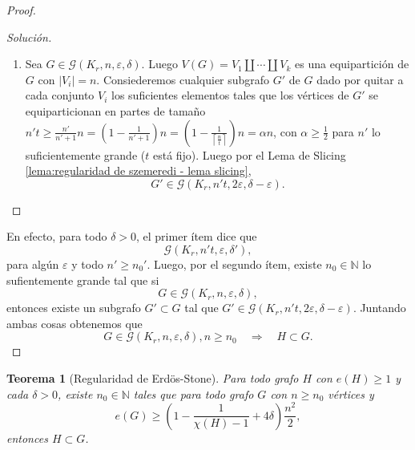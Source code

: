 \documentclass[12pt]{report}
\theoremstyle{plain}
\newtheorem{theorem}{Teorema}[section]
\theoremstyle{definition}
\newenvironment{solution}{\begin{proof}[Solución]}{\end{proof}}
\newcommand{\naturals}{\mathbb{N}}
\newcommand{\abs}[1]{\left \vert #1 \right \vert}
\newcommand{\ceil}[1]{\left\lceil #1  \right\rceil}
\begin{document}
\begin{proof}
\begin{solution}
\begin{enumerate}[(1)]
Ahora busquemos $\varepsilon$ y $\delta'$ tales que $G \in \mathcal G (K_r (t), n', \varepsilon ', \delta')$. Pero si $w_i^j w_{i'}^{j'} \in E(K_r (t))$, entonces $w_i w_{i'} \in E(K_r)$, y por lo tanto el par $(V_i, V_{i'})$ es $\varepsilon$ regular y como $\abs {V_i^j} = \frac{1}{t} \abs{V_i}$ para todo $1 \leq j \leq t$, el Lema de Slicing \ref{lema:regularidad de szemeredi - lema slicing} garantiza que los pares $(V_i^j, V_{i'}^{j'})$ para $1 \leq j,j' \leq t$ son $\max \{t \varepsilon, 2 \varepsilon\}$-regularaes si $\varepsilon$ es lo suficientemente pequeño, i.e. $\frac 1 t > \varepsilon$. En cuanto a la densidad, nuevamente el Lema de Slicing garantiza que
\[
    d(A_i^j, A_{i'}^{j'}) \geq d(A_i, A_{i'}) - \varepsilon  \geq \delta - \varepsilon.
\]

Por lo tanto, tomamos $\varepsilon < \min \{\varepsilon '/2, \frac 1 t \varepsilon ', \frac 1 t, \delta / 2\}$ y $\delta' =  \delta /2$ y funciona.
\item Sea $G \in \mathcal G (K_r, n , \varepsilon, \delta)$. Luego $V(G) = V_1 \coprod \cdots \coprod V_k$ es una equipartición de $G$ con $\abs{V_i} = n$. Consiederemos cualquier subgrafo $G'$ de $G$ dado por quitar a cada conjunto $V_i$ los suficientes elementos tales que los vértices de $G'$ se equiparticionan en partes de tamaño $n't \geq \frac{n'}{n' + 1} n = (1 - \frac{1}{n'+1}) n = \left (1 - \frac{1}{\ceil {\frac{n}{t}}}\right ) n = \alpha n$, con $\alpha \geq \frac{1}{2}$ para $n'$ lo suficientemente grande ($t$ está fijo). Luego por el Lema de Slicing \ref{lema:regularidad de szemeredi - lema slicing},
\[
    G' \in \mathcal G (K_r, n' t, 2 \varepsilon, \delta - \varepsilon).
\]
\end{enumerate}
\end{solution}

En efecto, para todo $\delta > 0$, el primer ítem dice que
\[
    \mathcal G (K_r, n' t, \varepsilon , \delta '),
\]
para algún $\varepsilon$ y todo $n' \geq n_0'$. Luego, por el segundo ítem, existe $n_0 \in \naturals$ lo sufientemente grande tal que si
\[
    G \in \mathcal G (K_r, n, \varepsilon, \delta),
\]
entonces existe un subgrafo $G' \subset G$ tal que $G' \in \mathcal G (K_r, n' t, 2 \varepsilon , \delta - \varepsilon)$. Juntando ambas cosas obtenemos que
\[
    G \in \mathcal G (K_r, n , \varepsilon, \delta), n \geq n_0 \quad \Rightarrow \quad H \subset G.
\]
\end{proof}

\begin{theorem}[Regularidad de Erdös-Stone]
Para todo grafo $H$ con $e(H) \geq 1$ y cada $\delta > 0$, existe $n_0 \in \naturals$ tales que para todo grafo $G$ con $n \geq n_0$ vértices y
\[
    e(G) \geq \left ( 1 - \frac{1}{\chi (H)- 1} + 4 \delta\right ) \frac{n^2}{2},
\]
entonces $H \subset G$.
\end{theorem}
\end{document}
